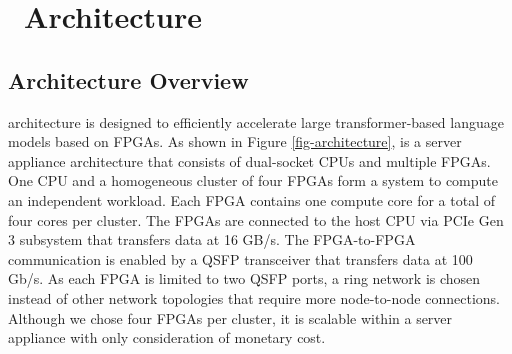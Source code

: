 

\section{\sysname~Architecture}
\label{architecture}

\subsection{Architecture Overview}
\sysname{} architecture is designed to efficiently accelerate large transformer-based language models based on FPGAs. As shown in Figure \ref{fig-architecture}, \sysname{} is a server appliance architecture that consists of dual-socket CPUs and multiple FPGAs. One CPU and a homogeneous cluster of four FPGAs form a system to compute an independent workload. Each FPGA contains one compute core for a total of four cores per cluster. The FPGAs are connected to the host CPU via PCIe Gen 3 subsystem that transfers data at 16 GB/s. The FPGA-to-FPGA communication is enabled by a  QSFP transceiver that transfers data at 100 Gb/s. As each FPGA is limited to two QSFP ports, a ring network is chosen instead of other network topologies that require more node-to-node connections. 
Although we chose four FPGAs per cluster, it is scalable within a server appliance with only consideration of monetary cost.



